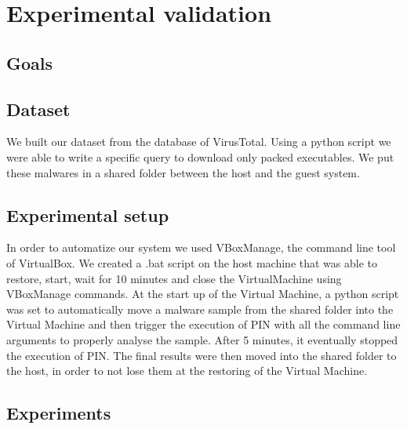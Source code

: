 \chapter{Experimental validation}
\label{chapter5}
\thispagestyle{empty}

\section{Goals}


\section{Dataset}
We built our dataset from the database of VirusTotal. Using a python script we were able to write a specific query to download only packed executables. We put these malwares in a shared folder between the host and the guest system.

\section{Experimental setup}
In order to automatize our system we used VBoxManage, the command line tool of VirtualBox. We created a .bat script on the host machine that was able to restore, start, wait for 10 minutes and close the VirtualMachine using VBoxManage commands. At the start up of the Virtual Machine, a python script was set to automatically move a malware sample from the shared folder into the Virtual Machine and then trigger the execution of PIN with all the command line arguments to properly analyse the sample. After 5 minutes, it eventually stopped the execution of PIN. The final results were then moved into the shared folder to the host, in order to not lose them at the restoring of the Virtual Machine.

\section{Experiments}

